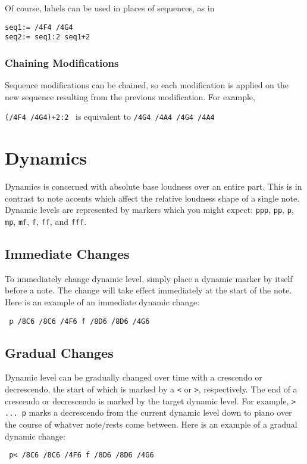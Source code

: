 \documentclass{scrartcl}
\begin{document}
Of course, labels can be used in places of sequences, as in
\begin{tabbing}
  \hspace{1in}\= \verb|seq1:= /4F4 /4G4| \\
  \> \verb|seq2:= seq1:2 seq1+2|
\end{tabbing}

\subsubsection{Chaining Modifications}
Sequence modifications can be chained, so each modification is applied on the new sequence resulting from the previous modification. For example,
\begin{center}
\verb|(/4F4 /4G4)+2:2| \ is equivalent to \verb|/4G4 /4A4 /4G4 /4A4|
\end{center}

\section{Dynamics}
Dynamics is concerned with absolute base loudness over an entire part. This is in contrast to note accents which affect the relative loudness shape of a single note. Dynamic levels are represented by markers which you might expect: \verb|ppp|, \verb|pp|, \verb|p|, \verb|mp|, \verb|mf|, \verb|f|, \verb|ff|, and \verb|fff|.

\subsection{Immediate Changes}
To immediately change dynamic level, simply place a dynamic marker by itself before a note. The change will take effect immediately at the start of the note. Here is an example of an immediate dynamic change: \begin{center}
\verb| p /8C6 /8C6 /4F6 f /8D6 /8D6 /4G6 |
\end{center}

\subsection{Gradual Changes}
Dynamic level can be gradually changed over time with a crescendo or decrescendo, the start of which is marked by a \verb|<| or \verb|>|, respectively. The end of a crescendo or decrescendo is marked by the target dynamic level. For example, \verb|> ... p| marks a decrescendo from the current dynamic level down to piano over the course of whatver note/rests come between. Here is an example of a gradual dynamic change:
\begin{center}
\verb| p< /8C6 /8C6 /4F6 f /8D6 /8D6 /4G6 |
\end{center}
\end{document}
